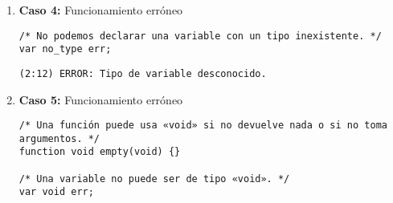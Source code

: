 \begin{enumerate}
\begin{tcolorbox}[title={Árbol sintáctico generado con la herramienta VASt}, colback=white, breakable]
\begin{lstlisting}
                                · id
                                · C (58)
                                  · lambda
                              · B1 (48)
                                · lambda
                          · A1 (43)
                            · lambda
                        · EXP1 (38)
                          · lambda
                      · ;
                  · P (2)
                    · STATEMENT (19)
                      · ATOMSTATEMENT (21)
                        · output
                        · EXP (36)
                          · A (41)
                            · B (46)
                              · EXPATOM (54)
                                · cstr
                              · B1 (48)
                                · lambda
                            · A1 (43)
                              · lambda
                          · EXP1 (38)
                            · lambda
                        · ;
                    · P (3)
                      · eof
        \end{lstlisting}
    \end{tcolorbox}

    
    \item \textbf{Caso 4:} Funcionamiento erróneo
    \begin{tcolorbox}[title={Código fuente}, colback=white, breakable]
        \begin{lstlisting}
/* No podemos declarar una variable con un tipo inexistente. */
var no_type err;
        \end{lstlisting}      
    \end{tcolorbox}

    \begin{tcolorbox}[title={Errores detectados}, colback=white]
        \begin{lstlisting}
(2:12) ERROR: Tipo de variable desconocido.
        \end{lstlisting}
    \end{tcolorbox}


    \item \textbf{Caso 5:} Funcionamiento erróneo
    \begin{tcolorbox}[title={Código fuente}, colback=white, breakable]
        \begin{lstlisting}
/* Una función puede usa «void» si no devuelve nada o si no toma argumentos. */
function void empty(void) {}

/* Una variable no puede ser de tipo «void». */
var void err;
        \end{lstlisting}      
    \end{tcolorbox}


\end{enumerate}

